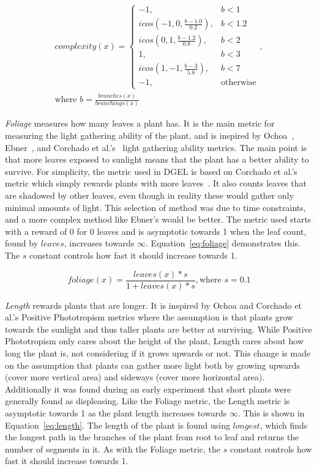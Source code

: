 \begin{equation}
\label{eq:complexity}
\begin{aligned}
    complexity(x) =
    \begin{cases}
        -1, & b < 1 \\
        icos(-1, 0, \frac{b - 1.0}{0.2}), & b < 1.2 \\
        icos(0, 1, \frac{b - 1.2}{0.8}), & b < 2 \\
        1, & b < 3 \\
        icos(1, -1, \frac{b - 3}{5.8}), & b < 7 \\
        -1, & \text{otherwise}
    \end{cases}, \\
    \text{where } b = \frac{branches(x)}{branchings(x)}
\end{aligned}
\end{equation}

\textit{Foliage} measures how many leaves a plant has.
It is the main metric for measuring the light gathering ability of the plant, and is inspired by Ochoa~\cite{1998Ochoa}, Ebner~\cite{2003Ebner}, and Corchado et al.'s~\cite{2009Corchado} light gathering ability metrics.
The main point is that more leaves exposed to sunlight means that the plant has a better ability to survive.
For simplicity, the metric used in DGEL is based on Corchado et al.'s metric which simply rewards plants with more leaves~\cite{2009Corchado}.
It also counts leaves that are shadowed by other leaves, even though in reality these would gather only minimal amounts of light.
This selection of method was due to time constraints, and a more complex method like Ebner's would be better.
The metric used starts with a reward of 0 for 0 leaves and is asymptotic towards 1 when the leaf count, found by $leaves$, increases towards $\infty$.
Equation~\ref{eq:foliage} demonstrates this.
The $s$ constant controls how fast it should increase towards 1.

\begin{equation}
\label{eq:foliage}
    foliage(x) = \frac{leaves(x) * s}{1 + leaves(x) * s}, \text{where } s = 0.1
\end{equation}

\textit{Length} rewards plants that are longer.
It is inspired by Ochoa and Corchado et al.'s Positive Phototropism metrics where the assumption is that plants grow towards the sunlight and thus taller plants are better at surviving.
While Positive Phototropism only cares about the height of the plant, Length cares about how long the plant is, not considering if it grows upwards or not.
This change is made on the assumption that plants can gather more light both by growing upwards (cover more vertical area) and sideways (cover more horizontal area).
Additionally it was found during an early experiment that short plants were generally found as displeasing.
Like the Foliage metric, the Length metric is asymptotic towards 1 as the plant length increases towards $\infty$.
This is shown in Equation~\ref{eq:length}.
The length of the plant is found using $longest$, which finds the longest path in the branches of the plant from root to leaf and returns the number of segments in it.
As with the Foliage metric, the $s$ constant controls how fast it should increase towards 1.

